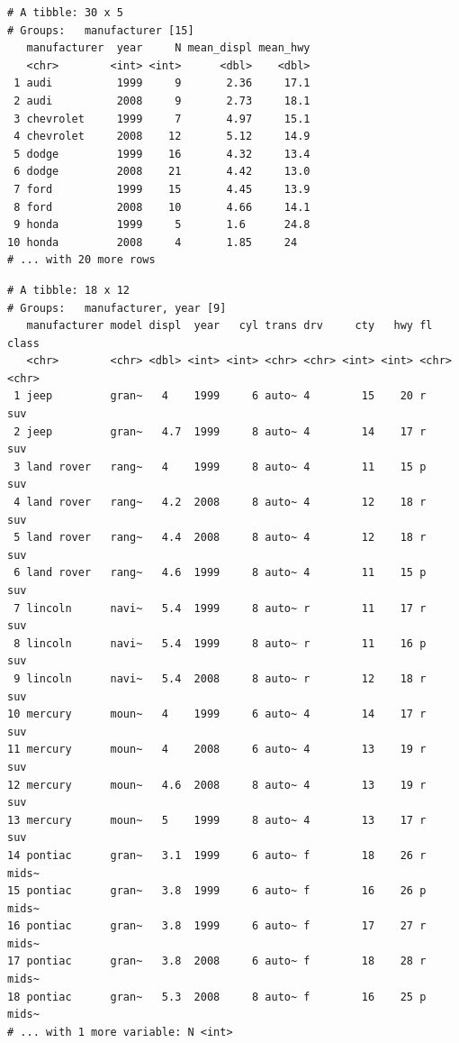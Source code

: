 \documentclass[
  11pt,
]{krantz}
\newenvironment{Shaded}{\begin{snugshade}}{\end{snugshade}}
\newcommand{\CommentTok}[1]{\textcolor[rgb]{0.37,0.37,0.37}{\textit{#1}}}
\newcommand{\DataTypeTok}[1]{\textcolor[rgb]{0.27,0.27,0.27}{#1}}
\newcommand{\DecValTok}[1]{\textcolor[rgb]{0.06,0.06,0.06}{#1}}
\newcommand{\KeywordTok}[1]{\textcolor[rgb]{0.27,0.27,0.27}{\textbf{#1}}}
\newcommand{\NormalTok}[1]{#1}
\newcommand{\OperatorTok}[1]{\textcolor[rgb]{0.43,0.43,0.43}{\textbf{#1}}}
\newcommand{\StringTok}[1]{\textcolor[rgb]{0.5,0.5,0.5}{#1}}
\begin{document}
\begin{verbatim}
# A tibble: 30 x 5
# Groups:   manufacturer [15]
   manufacturer  year     N mean_displ mean_hwy
   <chr>        <int> <int>      <dbl>    <dbl>
 1 audi          1999     9       2.36     17.1
 2 audi          2008     9       2.73     18.1
 3 chevrolet     1999     7       4.97     15.1
 4 chevrolet     2008    12       5.12     14.9
 5 dodge         1999    16       4.32     13.4
 6 dodge         2008    21       4.42     13.0
 7 ford          1999    15       4.45     13.9
 8 ford          2008    10       4.66     14.1
 9 honda         1999     5       1.6      24.8
10 honda         2008     4       1.85     24  
# ... with 20 more rows
\end{verbatim}

\begin{Shaded}
\end{Shaded}

\begin{verbatim}
# A tibble: 18 x 12
# Groups:   manufacturer, year [9]
   manufacturer model displ  year   cyl trans drv     cty   hwy fl    class
   <chr>        <chr> <dbl> <int> <int> <chr> <chr> <int> <int> <chr> <chr>
 1 jeep         gran~   4    1999     6 auto~ 4        15    20 r     suv  
 2 jeep         gran~   4.7  1999     8 auto~ 4        14    17 r     suv  
 3 land rover   rang~   4    1999     8 auto~ 4        11    15 p     suv  
 4 land rover   rang~   4.2  2008     8 auto~ 4        12    18 r     suv  
 5 land rover   rang~   4.4  2008     8 auto~ 4        12    18 r     suv  
 6 land rover   rang~   4.6  1999     8 auto~ 4        11    15 p     suv  
 7 lincoln      navi~   5.4  1999     8 auto~ r        11    17 r     suv  
 8 lincoln      navi~   5.4  1999     8 auto~ r        11    16 p     suv  
 9 lincoln      navi~   5.4  2008     8 auto~ r        12    18 r     suv  
10 mercury      moun~   4    1999     6 auto~ 4        14    17 r     suv  
11 mercury      moun~   4    2008     6 auto~ 4        13    19 r     suv  
12 mercury      moun~   4.6  2008     8 auto~ 4        13    19 r     suv  
13 mercury      moun~   5    1999     8 auto~ 4        13    17 r     suv  
14 pontiac      gran~   3.1  1999     6 auto~ f        18    26 r     mids~
15 pontiac      gran~   3.8  1999     6 auto~ f        16    26 p     mids~
16 pontiac      gran~   3.8  1999     6 auto~ f        17    27 r     mids~
17 pontiac      gran~   3.8  2008     6 auto~ f        18    28 r     mids~
18 pontiac      gran~   5.3  2008     8 auto~ f        16    25 p     mids~
# ... with 1 more variable: N <int>
\end{verbatim}
\end{document}
